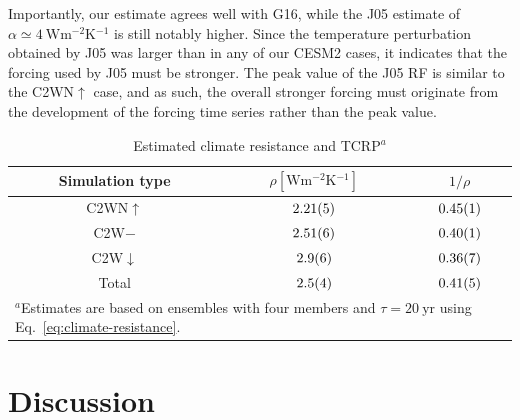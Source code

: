 \documentclass[draft]{agujournal2019}
\newcommand{\cwm}{C2W\(\downarrow\)}
\newcommand{\cwmp}{C2W\(-\)}
\newcommand{\cws}{C2WN\(\uparrow\)}
\begin{document}
Importantly, our estimate agrees well with G16, while the J05 estimate of \(\alpha
\simeq \SI{4}{\watt\metre^{-2}\kelvin^{-1}}\) is still notably higher. Since the
temperature perturbation obtained by J05 was larger than in any of our CESM2 cases, it
indicates that the forcing used by J05 must be stronger. The peak value of the J05 RF is
similar to the \cws{} case, and as such, the overall stronger forcing must originate
from the development of the forcing time series rather than the peak value.

\begin{table}
  \centering

  \caption{Estimated climate resistance and TCRP\(^{a}\)}\label{tab:trcp}%
  \begin{tabular}{ccc}
    \toprule
    Simulation type & \(\rho [\si{\watt\metre^{-2}\kelvin^{-1}}]\) & \(1/\rho\)            \\
    \midrule
    \cws{}          & \(\num{2.21\pm0.05}\)                        & \(\num{0.45\pm0.01}\) \\
    \cwmp{}         & \(\num{2.51\pm0.06}\)                        & \(\num{0.40\pm0.01}\) \\
    \cwm{}          & \(\num{2.9\pm0.6}\)                          & \(\num{0.36\pm0.07}\) \\
    Total           & \(\num{2.5\pm0.4}\)                          & \(\num{0.41\pm0.05}\) \\
    \toprule
    \multicolumn{3}{l}{\parbox{\linewidth}{\(^{a}\)Estimates are based on ensembles with four members and \(\tau
    =\SI{20}{\mathrm{yr}}\) using Eq.~\ref{eq:climate-resistance}.}}                       \\
  \end{tabular}
\end{table}

\section{Discussion}\label{sec:discussion}

\end{document}
